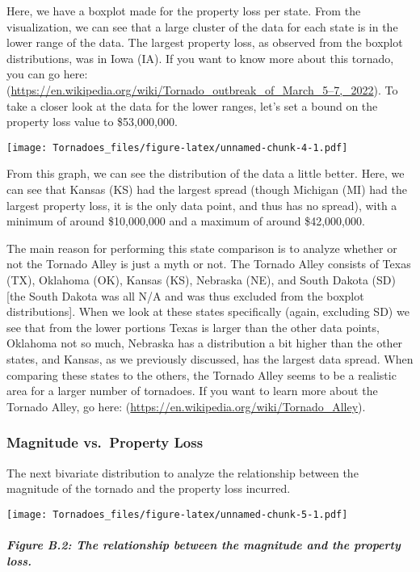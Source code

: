 \documentclass[
]{article}
\begin{document}
Here, we have a boxplot made for the property loss per state. From the
visualization, we can see that a large cluster of the data for each
state is in the lower range of the data. The largest property loss, as
observed from the boxplot distributions, was in Iowa (IA). If you want
to know more about this tornado, you can go here:
(\url{https://en.wikipedia.org/wiki/Tornado_outbreak_of_March_5–7,_2022}).
To take a closer look at the data for the lower ranges, let's set a
bound on the property loss value to \$53,000,000.

\texttt{[image: Tornadoes\_files/figure-latex/unnamed-chunk-4-1.pdf]}

From this graph, we can see the distribution of the data a little
better. Here, we can see that Kansas (KS) had the largest spread (though
Michigan (MI) had the largest property loss, it is the only data point,
and thus has no spread), with a minimum of around \$10,000,000 and a
maximum of around \$42,000,000.

The main reason for performing this state comparison is to analyze
whether or not the Tornado Alley is just a myth or not. The Tornado
Alley consists of Texas (TX), Oklahoma (OK), Kansas (KS), Nebraska (NE),
and South Dakota (SD) {[}the South Dakota was all N/A and was thus
excluded from the boxplot distributions{]}. When we look at these states
specifically (again, excluding SD) we see that from the lower portions
Texas is larger than the other data points, Oklahoma not so much,
Nebraska has a distribution a bit higher than the other states, and
Kansas, as we previously discussed, has the largest data spread. When
comparing these states to the others, the Tornado Alley seems to be a
realistic area for a larger number of tornadoes. If you want to learn
more about the Tornado Alley, go here:
(\url{https://en.wikipedia.org/wiki/Tornado_Alley}).

\subsubsection{Magnitude vs.~Property
Loss}\label{magnitude-vs.-property-loss}

The next bivariate distribution to analyze the relationship between the
magnitude of the tornado and the property loss incurred.

\texttt{[image: Tornadoes\_files/figure-latex/unnamed-chunk-5-1.pdf]}

\subparagraph{Figure B.2: The relationship between the magnitude and the
property
loss.}\label{figure-b.2-the-relationship-between-the-magnitude-and-the-property-loss.}
\end{document}
